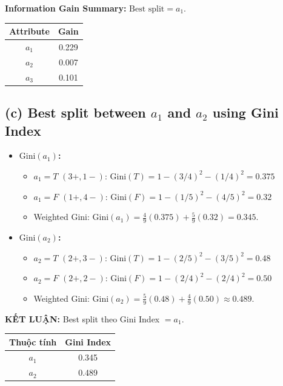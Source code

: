 \textbf{Information Gain Summary:} $\text{Best split} = a_1$.
\begin{table}[H]
    \centering
    \begin{tabular}{|c|c|}
        \hline
        \textbf{Attribute} & \textbf{Gain} \\
        \hline
        $a_1$ & 0.229 \\ \hline
        $a_2$ & 0.007 \\ \hline
        $a_3$ & 0.101 \\ \hline
    \end{tabular}
\end{table}

\subsection*{(c) Best split between $a_1$ and $a_2$ using Gini Index}
\begin{itemize}
    \item \textbf{$\text{Gini}(a_1)$:}
    \begin{itemize}
        \item $a_1 = T$ $(3+, 1-)$: $\text{Gini}(T) = 1 - (3/4)^2 - (1/4)^2 = 0.375$
        \item $a_1 = F$ $(1+, 4-)$: $\text{Gini}(F) = 1 - (1/5)^2 - (4/5)^2 = 0.32$
        \item Weighted Gini: $\text{Gini}(a_1) = \frac{4}{9}(0.375) + \frac{5}{9}(0.32) = 0.345$.
    \end{itemize}
    \item \textbf{$\text{Gini}(a_2)$:}
    \begin{itemize}
        \item $a_2 = T$ $(2+, 3-)$: $\text{Gini}(T) = 1 - (2/5)^2 - (3/5)^2 = 0.48$
        \item $a_2 = F$ $(2+, 2-)$: $\text{Gini}(F) = 1 - (2/4)^2 - (2/4)^2 = 0.50$
        \item Weighted Gini: $\text{Gini}(a_2) = \frac{5}{9}(0.48) + \frac{4}{9}(0.50) \approx 0.489$.
    \end{itemize}
\end{itemize}
\textbf{KẾT LUẬN:} Best split theo Gini Index $= a_1$.
\begin{table}[H]
    \centering
    \begin{tabular}{|c|c|}
        \hline
        \textbf{Thuộc tính} & \textbf{Gini Index} \\
        \hline
        $a_1$ & 0.345 \\ \hline
        $a_2$ & 0.489 \\ \hline
    \end{tabular}
\end{table}